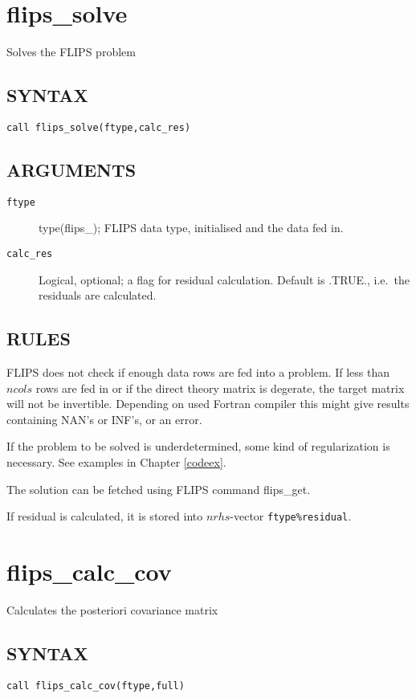 \documentclass[a4paper,twoside]{refrep}
\newcommand{\code}[1]{{\tt #1}}
\newcommand{\aitem}[1]{\item[{\tt #1}]}
\newenvironment{arglist}
	{\begin{description}}
	{\end{description}}
\begin{document}
\newpage
\section{flips\_solve}
Solves the FLIPS problem

\subsection*{SYNTAX}
\code{call flips\_solve(ftype,calc\_res)}

\subsection*{ARGUMENTS}
\begin{arglist}
\aitem{ftype} type(flips\_<s|d|c|z>); FLIPS data type, initialised and the data fed in.
\aitem{calc\_res} Logical, optional; a flag for residual calculation. Default is .TRUE., i.e.\ the residuals are calculated.
\end{arglist}

\subsection*{RULES}

\attention FLIPS does not check if enough data rows are fed into a problem. If less than $ncols$ rows are fed in or if the direct theory matrix is degerate, the target matrix will not be invertible. Depending on used Fortran compiler this might give results containing NAN's or INF's, or an error. 

If the problem to be solved is underdetermined, some kind of regularization is necessary. \seealso{\ref{underdet}} See examples in Chapter \ref{codeex}.

\seealso{\ref{flipsget}}The solution can be fetched using FLIPS command flips\_get.

If residual is calculated, it is stored into $nrhs$-vector \code{ftype\%residual}.


\newpage
\section{flips\_calc\_cov}
Calculates the posteriori covariance matrix

\subsection*{SYNTAX}
\code{call flips\_calc\_cov(ftype,full)}
\end{document}
